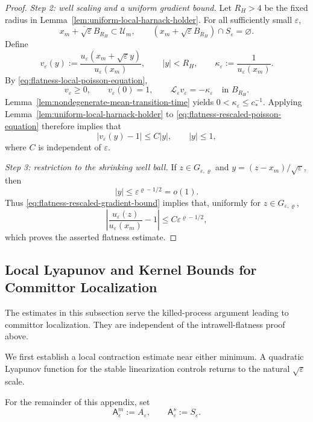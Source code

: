 \documentclass[11pt]{article}
\numberwithin{equation}{section}
\theoremstyle{plain}
\theoremstyle{definition}
\theoremstyle{remark}
\newcommand{\eps}{\varepsilon}
\begin{document}
\begin{proof}
\emph{Step 2: well scaling and a uniform gradient bound.}
Let $R_H>4$ be the fixed radius in
Lemma~\ref{lem:uniform-local-harnack-holder}.  For all sufficiently small
$\eps$,
\[
\overline{x_m+\sqrt\eps B_{R_H}}\subset\mathscr U_m,
\qquad
\left(x_m+\sqrt\eps B_{R_H}\right)\cap S_\eps=\varnothing.
\]
Define
\[
v_\eps(y):=
\frac{u_\eps(x_m+\sqrt\eps y)}{u_\eps(x_m)},
\qquad |y|<R_H,
\qquad
\kappa_\eps:=\frac1{u_\eps(x_m)}.
\]
By \eqref{eq:flatness-local-poisson-equation},
\begin{equation}
\label{eq:flatness-rescaled-poisson-equation}
v_\eps\ge0,
\qquad v_\eps(0)=1,
\qquad \mathscr L_\eps v_\eps=-\kappa_\eps
\quad\text{in }B_{R_H}.
\end{equation}
Lemma~\ref{lem:nondegenerate-mean-transition-time} yields
$0<\kappa_\eps\le c_*^{-1}$.  Applying
Lemma~\ref{lem:uniform-local-harnack-holder} to
\eqref{eq:flatness-rescaled-poisson-equation} therefore implies that
\begin{equation}
\label{eq:flatness-rescaled-gradient-bound}
|v_\eps(y)-1|\le C|y|,
\qquad |y|\le1,
\end{equation}
where $C$ is independent of $\eps$.

\emph{Step 3: restriction to the shrinking well ball.}
If $z\in G_{\eps,\varrho}$ and
$y=(z-x_m)/\sqrt\eps$, then
\[
|y|\le\eps^{\varrho-1/2}=o(1).
\]
Thus \eqref{eq:flatness-rescaled-gradient-bound} implies that, uniformly for
$z\in G_{\eps,\varrho}$,
\[
\left|
\frac{u_\eps(z)}{u_\eps(x_m)}-1
\right|
\le C\eps^{\varrho-1/2},
\]
which proves the asserted flatness estimate.
\end{proof}

\subsection{Local Lyapunov and Kernel Bounds for Committor Localization}
\label{app:local-kernel-committor}

The estimates in this subsection serve the killed-process argument leading
to committor localization.  They are independent of the intrawell-flatness
proof above.

We first establish a local contraction estimate near either minimum.  A
quadratic Lyapunov function for the stable linearization controls returns to
the natural $\sqrt\eps$ scale.

For the remainder of this appendix, set
\[
\mathsf A_\eps^m:=A_\eps,
\qquad
\mathsf A_\eps^s:=S_\eps.
\]
\end{document}
